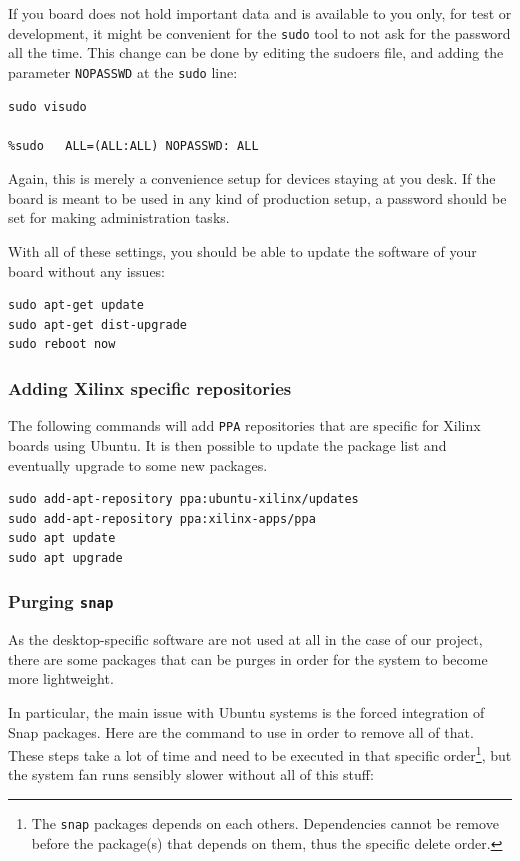 \documentclass[10pt]{article}
\begin{document}
If you board does not hold important data
and is available to you only, for test or development,
it might be convenient for the \texttt{sudo} tool to not ask for the
password all the time.
This change can be done by editing the sudoers file, and
adding the parameter \texttt{NOPASSWD}
at the \texttt{sudo} line:

\begin{verbatim}
sudo visudo

%sudo   ALL=(ALL:ALL) NOPASSWD: ALL
\end{verbatim}

Again, this is merely a convenience setup for devices staying at you desk. If
the board is meant to be used in any kind of production setup, a password
should be set for making administration tasks.

With all of these settings, you should be able to update the software of your
board without any issues:
\begin{verbatim}
sudo apt-get update
sudo apt-get dist-upgrade
sudo reboot now
\end{verbatim}

\subsubsection{Adding Xilinx specific repositories}
\label{sec:orgd02d47e}
The following commands will add \texttt{PPA} repositories that are specific for Xilinx boards using Ubuntu.
It is then possible to update the package list and eventually upgrade to some new packages.
\begin{verbatim}
sudo add-apt-repository ppa:ubuntu-xilinx/updates
sudo add-apt-repository ppa:xilinx-apps/ppa
sudo apt update
sudo apt upgrade
\end{verbatim}

\subsubsection{Purging \texttt{snap}}
\label{sec:org2b7c934}
As the desktop-specific software are not used at all in the case
of our project, there are some packages that can be purges in order for the
system to become more lightweight.

In particular, the main issue with Ubuntu systems is the forced integration of
Snap packages. Here are the command to use in order to remove all of that.
These steps take a lot of time and need to be executed in that specific order\footnote{The \texttt{snap} packages depends on each others. Dependencies
cannot be remove before the package(s) that depends on them,
thus the specific delete order.},
but the system fan runs sensibly slower without all of this stuff:
\end{document}
